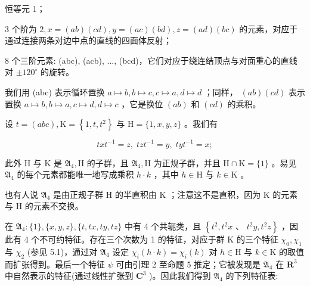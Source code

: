 \documentclass[10pt]{article}
\begin{document}
恒等元 1；

3 个阶为 \(2,x = \left( {ab}\right) \left( {cd}\right) ,y = \left( {ac}\right) \left( {bd}\right) ,z = \left( {ad}\right) \left( {bc}\right)\) 的元素，对应于通过连接两条对边中点的直线的四面体反射；

8 个三阶元素: (abc), (acb), ..., (bcd)，它们对应于绕连结顶点与对面重心的直线对 \(\pm  {120}^{ \circ  }\) 的旋转。

我们用 (abc) 表示循环置换 \(a \mapsto  b,b \mapsto  c,c \mapsto  a,d \mapsto  d\) ；同样， \(\left( {ab}\right) \left( {cd}\right)\) 表示置换 \(a \mapsto  b,b \mapsto  a,c \mapsto  d,d \mapsto  c\) ，它是换位 \(\left( {ab}\right)\) 和 \(\left( {cd}\right)\) 的乘积。

设 \(t = \left( {abc}\right) ,\mathrm{K} = \left\{  {1,t,{t}^{2}}\right\}\) 与 \(\mathrm{H} = \{ 1,x,y,z\}\) 。我们有

\[
{tx}{t}^{-1} = z,\;{tz}{t}^{-1} = y,\;{ty}{t}^{-1} = x;
\]

此外 \(\mathrm{H}\) 与 \(\mathrm{K}\) 是 \({\mathfrak{A}}_{4},\mathrm{H}\) 的子群，且 \({\mathfrak{A}}_{4},\mathrm{H}\) 为正规子群，并且 \(\mathrm{H} \cap  \mathrm{K} = \{ 1\}\) 。易见 \({\mathfrak{A}}_{4}\) 的每个元素都能唯一地写成乘积 \(h \cdot  k\) ，其中 \(h \in  \mathrm{H}\) 与 \(k \in  \mathrm{K}\) 。

也有人说 \({\mathfrak{A}}_{4}\) 是由正规子群 \(\mathrm{H}\) 的半直积由 \(\mathrm{K}\) ；注意这不是直积，因为 K 的元素与 \(\mathrm{H}\) 的元素不交换。

在 \({\mathfrak{A}}_{4} : \{ 1\} ,\{ x,y,z\} ,\{ t,{tx},{ty},{tz}\}\) 中有 4 个共轭类，且 \(\left\{  {{t}^{2},{t}^{2}x}\right.\) 、 \(\left. {{t}^{2}y,{t}^{2}z}\right\}\) ，因此有 4 个不可约特征。存在三个次数为 1 的特征，对应于群 \(\mathrm{K}\) 的三个特征 \({\chi }_{0},{\chi }_{1}\) 与 \({\chi }_{2}\) (参见 5.1)，通过对 \({\mathfrak{A}}_{4}\) 设定 \({\chi }_{i}\left( {h \cdot  k}\right)  = {\chi }_{i}\left( k\right)\) 对 \(h \in  \mathrm{H}\) 与 \(k \in  \mathrm{K}\) 的取值而扩张得到。最后一个特征 \(\psi\) 可由引理 2 至命题 5 推定；它被发现是 \({\mathfrak{A}}_{4}\) 在 \({\mathbf{R}}^{3}\) 中自然表示的特征(通过线性扩张到 \({\mathbf{C}}^{3}\) )。因此我们得到 \({\mathfrak{A}}_{4}\) 的下列特征表:

\begin{center}
\end{center}
\end{document}

